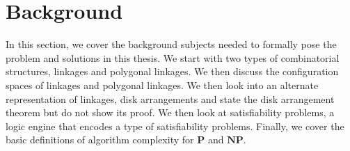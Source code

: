 \chapter{Background}
In this section, we cover the background subjects needed to formally pose the 
problem and solutions in this thesis.  We start with two types of combinatorial structures, linkages 
and polygonal linkages.  We then discuss the configuration spaces of linkages and polygonal 
linkages.   We then look into an alternate representation of linkages, disk arrangements and state 
the disk arrangement theorem but do not show its proof.  We then look at satisfiability problems, a 
logic engine that encodes a type of satisfiability problems.  Finally, we cover the basic 
definitions of algorithm complexity for $\textbf{P}$ and $\textbf{NP}$.